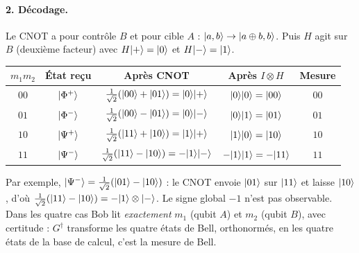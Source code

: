 \begin{correction}
\paragraph{2. Décodage.} Le CNOT a pour contrôle $B$ et pour cible $A$ : $|a,b\rangle\to|a\oplus b,b\rangle$. Puis
$H$ agit sur $B$ (deuxième facteur) avec $H|+\rangle=|0\rangle$ et $H|-\rangle=|1\rangle$.
\begin{center}
\renewcommand{\arraystretch}{1.35}
\begin{tabular}{@{}c c c c c@{}}
\toprule
$m_1m_2$ & État reçu & Après CNOT & Après $I\otimes H$ & Mesure \\
\midrule
$00$ & $|\Phi^+\rangle$ & $\frac{1}{\sqrt2}(|00\rangle+|01\rangle)=|0\rangle|+\rangle$ & $|0\rangle|0\rangle=|00\rangle$ & $00$ \\
$01$ & $|\Phi^-\rangle$ & $\frac{1}{\sqrt2}(|00\rangle-|01\rangle)=|0\rangle|-\rangle$ & $|0\rangle|1\rangle=|01\rangle$ & $01$ \\
$10$ & $|\Psi^+\rangle$ & $\frac{1}{\sqrt2}(|11\rangle+|10\rangle)=|1\rangle|+\rangle$ & $|1\rangle|0\rangle=|10\rangle$ & $10$ \\
$11$ & $|\Psi^-\rangle$ & $\frac{1}{\sqrt2}(|11\rangle-|10\rangle)=-|1\rangle|-\rangle$ & $-|1\rangle|1\rangle=-|11\rangle$ & $11$ \\
\bottomrule
\end{tabular}
\end{center}
Par exemple, $|\Psi^-\rangle=\frac{1}{\sqrt2}(|01\rangle-|10\rangle)$ : le CNOT envoie $|01\rangle$ sur $|11\rangle$ et
laisse $|10\rangle$, d'où $\frac{1}{\sqrt2}(|11\rangle-|10\rangle)=-|1\rangle\otimes|-\rangle$. Le signe global
$-1$ n'est pas observable. Dans les quatre cas Bob lit \emph{exactement} $m_1$ (qubit $A$) et $m_2$
(qubit $B$), avec certitude : $G^\dagger$ transforme les quatre états de Bell, orthonormés, en les
quatre états de la base de calcul, c'est la mesure de Bell.


\end{correction}
